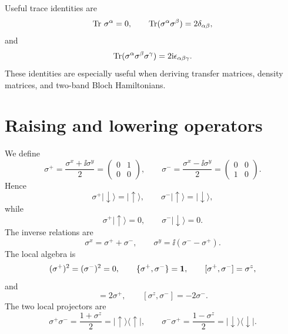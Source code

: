 Useful trace identities are
\begin{equation}
    \operatorname{Tr}\,\sigma^\alpha=0,
    \qquad
    \operatorname{Tr}(\sigma^\alpha\sigma^\beta)=2\delta_{\alpha\beta},
\end{equation}
and
\begin{equation}
    \operatorname{Tr}(\sigma^\alpha\sigma^\beta\sigma^\gamma)
    =
    2\mathrm{i}\epsilon_{\alpha\beta\gamma}.
\end{equation}
These identities are especially useful when deriving transfer matrices, density
matrices, and two-band Bloch Hamiltonians.

\section{Raising and lowering operators}

We define
\begin{equation}
\label{eq:sigma-pm-definition}
    \sigma^+
    =
    \frac{\sigma^x+\ii\sigma^y}{2}
    =
    \begin{pmatrix}
        0&1\\
        0&0
    \end{pmatrix},
    \qquad
    \sigma^-
    =
    \frac{\sigma^x-\ii\sigma^y}{2}
    =
    \begin{pmatrix}
        0&0\\
        1&0
    \end{pmatrix}.
\end{equation}
Hence
\begin{equation}
    \sigma^+|\downarrow\rangle=|\uparrow\rangle,
    \qquad
    \sigma^-|\uparrow\rangle=|\downarrow\rangle,
\end{equation}
while
\begin{equation}
    \sigma^+|\uparrow\rangle=0,
    \qquad
    \sigma^-|\downarrow\rangle=0.
\end{equation}
The inverse relations are
\begin{equation}
\label{eq:sigma-x-y-pm}
    \sigma^x=\sigma^++\sigma^-,
    \qquad
    \sigma^y=\ii(\sigma^- -\sigma^+).
\end{equation}
The local algebra is
\begin{equation}
    (\sigma^+)^2=(\sigma^-)^2=0,
    \qquad
    \{\sigma^+,\sigma^-\}=\mathbf{1},
    \qquad
    [\sigma^+,\sigma^-]=\sigma^z,
\end{equation}
and
\begin{equation}
    [\sigma^z,\sigma^+]=2\sigma^+,
    \qquad
    [\sigma^z,\sigma^-]=-2\sigma^-.
\end{equation}
The two local projectors are
\begin{equation}
\label{eq:spin-projectors}
    \sigma^+\sigma^-=\frac{1+\sigma^z}{2}=|\uparrow\rangle\langle\uparrow|,
    \qquad
    \sigma^-\sigma^+=\frac{1-\sigma^z}{2}=|\downarrow\rangle\langle\downarrow|.
\end{equation}

